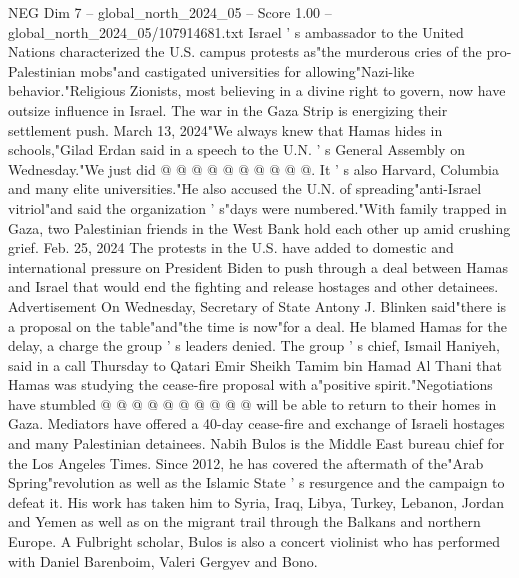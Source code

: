 \begin{textsample}{NEG Dim 7 – global\_north\_2024\_05 – Score 1.00 – global\_north\_2024\_05/107914681.txt}
Israel ' s ambassador to the United Nations characterized the U.S. campus protests as"the murderous cries of the pro-Palestinian mobs"and castigated universities for allowing"Nazi-like behavior."Religious Zionists, most believing in a divine right to govern, now have outsize influence in Israel.
The war in the Gaza Strip is energizing their settlement push.
March 13, 2024"We always knew that Hamas hides in schools,"Gilad Erdan said in a speech to the U.N. ' s General Assembly on Wednesday."We just did @ @ @ @ @ @ @ @ @ @.
It ' s also Harvard, Columbia and many elite universities."He also accused the U.N. of spreading"anti-Israel vitriol"and said the organization ' s"days were numbered."With family trapped in Gaza, two Palestinian friends in the West Bank hold each other up amid crushing grief.
Feb. 25, 2024 The protests in the U.S. have added to domestic and international pressure on President Biden to push through a deal between Hamas and Israel that would end the fighting and release hostages and other detainees.
Advertisement On Wednesday, Secretary of State Antony J.
Blinken said"there is a proposal on the table"and"the time is now"for a deal.
He blamed Hamas for the delay, a charge the group ' s leaders denied.
The group ' s chief, Ismail Haniyeh, said in a call Thursday to Qatari Emir Sheikh Tamim bin Hamad Al Thani that Hamas was studying the cease-fire proposal with a"positive spirit."Negotiations have stumbled @ @ @ @ @ @ @ @ @ @ will be able to return to their homes in Gaza.
Mediators have offered a 40-day cease-fire and exchange of Israeli hostages and many Palestinian detainees.
Nabih Bulos is the Middle East bureau chief for the Los Angeles Times.
Since 2012, he has covered the aftermath of the"Arab Spring"revolution as well as the Islamic State ' s resurgence and the campaign to defeat it.
His work has taken him to Syria, Iraq, Libya, Turkey, Lebanon, Jordan and Yemen as well as on the migrant trail through the Balkans and northern Europe.
A Fulbright scholar, Bulos is also a concert violinist who has performed with Daniel Barenboim, Valeri Gergyev and Bono.

\end{textsample}
